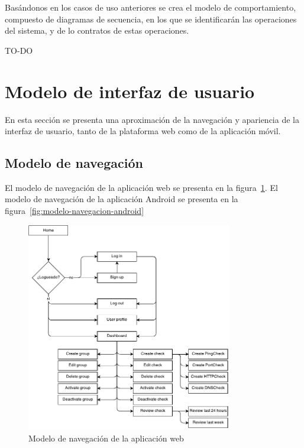Basándonos en los casos de uso anteriores se crea el modelo de comportamiento,
compuesto de diagramas de secuencia, en los que se identificarán las operaciones
del sistema, y de lo contratos de estas operaciones.

{\Huge TO-DO }



\section{Modelo de interfaz de usuario}

En esta sección se presenta una aproximación de la navegación y apariencia de la
interfaz de usuario, tanto de la plataforma web como de la aplicación móvil.

\subsection{Modelo de navegación}

El modelo de navegación de la aplicación web se presenta en la
figura~\ref{fig:modelo-navegacion-web}. El modelo de navegación de la aplicación
Android se presenta en la figura~\ref{fig:modelo-navegacion-android}

\begin{figure}[hbtp]
  \centering
  \includegraphics[width=0.8\textwidth]{4_analisis/diagrama_navegacion}
  \caption{Modelo de navegación de la aplicación web}
  \label{fig:modelo-navegacion-web}
\end{figure}

